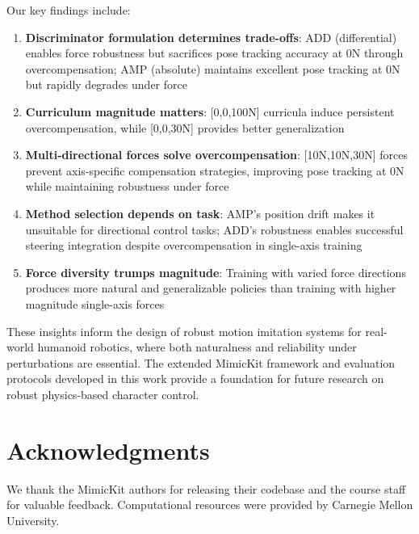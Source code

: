 \documentclass{article}
\begin{document}
Our key findings include:
\begin{enumerate}
\item \textbf{Discriminator formulation determines trade-offs}: ADD (differential) enables force robustness but sacrifices pose tracking accuracy at 0N through overcompensation; AMP (absolute) maintains excellent pose tracking at 0N but rapidly degrades under force
\item \textbf{Curriculum magnitude matters}: [0,0,100N] curricula induce persistent overcompensation, while [0,0,30N] provides better generalization
\item \textbf{Multi-directional forces solve overcompensation}: [10N,10N,30N] forces prevent axis-specific compensation strategies, improving pose tracking at 0N while maintaining robustness under force
\item \textbf{Method selection depends on task}: AMP's position drift makes it unsuitable for directional control tasks; ADD's robustness enables successful steering integration despite overcompensation in single-axis training
\item \textbf{Force diversity trumps magnitude}: Training with varied force directions produces more natural and generalizable policies than training with higher magnitude single-axis forces
\end{enumerate}

These insights inform the design of robust motion imitation systems for real-world humanoid robotics, where both naturalness and reliability under perturbations are essential. The extended MimicKit framework and evaluation protocols developed in this work provide a foundation for future research on robust physics-based character control.

\section*{Acknowledgments}

We thank the MimicKit authors for releasing their codebase and the course staff for valuable feedback. Computational resources were provided by Carnegie Mellon University.
\end{document}
